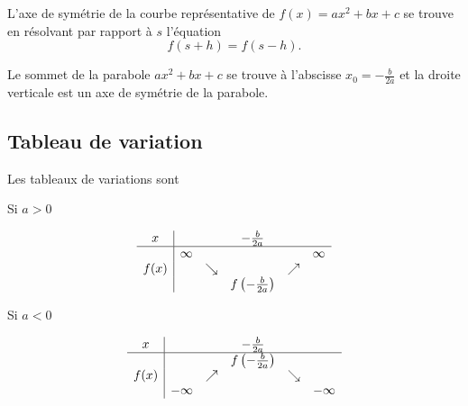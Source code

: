 L'axe de symétrie de la courbe représentative de \( f(x)=ax^2+bx+c\) se trouve en résolvant par rapport à \( s\) l'équation
\begin{equation}
    f(s+h)=f(s-h).
\end{equation}

\begin{Aretenir}
    Le sommet de la parabole \( ax^2+bx+c\) se trouve à l'abscisse \( x_0=-\frac{ b }{ 2a }\) et la droite verticale est un axe de symétrie de la parabole.
\end{Aretenir}

\clearpage
\subsection{Tableau de variation}

Les tableaux de variations sont
\begin{multicols}{2}

    \begin{center}
        Si \( a>0\)

        \begin{equation*}
            \begin{array}[]{c|ccccc}
                x&&&-\frac{ b }{ 2a }&&\\
                \hline
                &\infty&&&&\infty\\
                f(x)&&\searrow&&\nearrow&\\
                &&&f\left( -\frac{ b }{ 2a } \right)&&\\
            \end{array}
        \end{equation*}
        
    \end{center}

    \columnbreak

    \begin{center}
        Si \( a<0\)


        \begin{equation*}
            \begin{array}[]{c|ccccc}
                x&&&-\frac{ b }{ 2a }&&\\
                \hline
                &&&f\left( -\frac{ b }{ 2a } \right)&&\\
                f(x)&&\nearrow&&\searrow&\\
                &-\infty&&&&-\infty\\
            \end{array}
        \end{equation*}
    \end{center}
\end{multicols}

